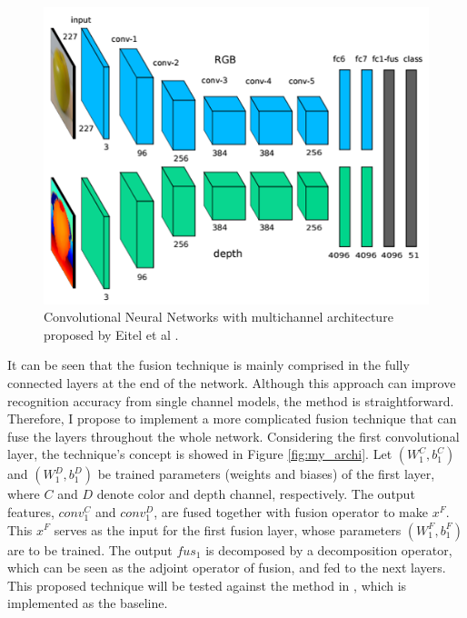 \documentclass[11pt,letterpaper]{article}
\begin{document}
\begin{figure}
	\centering
	\includegraphics{Picture1}
	\caption{Convolutional Neural Networks with multichannel architecture proposed by Eitel et al \cite{DBLP:journals/corr/EitelSSRB15}.}
	\label{fig:eitel_archi}
\end{figure}

It can be seen that the fusion technique is mainly comprised in the fully connected layers at the end of the network. Although this approach can improve recognition accuracy from single channel models, the method is straightforward. Therefore, I propose to implement a more complicated fusion technique that can fuse the layers throughout the whole network. Considering the first convolutional layer, the technique's concept is showed in Figure \ref{fig:my_archi}. Let $(W_1^C, b_1^C)$ and $(W_1^D, b_1^D)$ be trained parameters (weights and biases) of the first layer, where $C$ and $D$ denote color and depth channel, respectively. The output features, $conv_1^C$ and $conv_1^D$, are fused together with fusion operator to make $x^F$. This $x^F$ serves as the input for the first fusion layer, whose parameters $(W_1^F, b_1^F)$ are to be trained. The output $fus_1$ is decomposed by a decomposition operator, which can be seen as the adjoint operator of fusion, and fed to the next layers. This proposed technique will be tested against the method in \cite{DBLP:journals/corr/EitelSSRB15}, which is implemented as the baseline.
\end{document}
